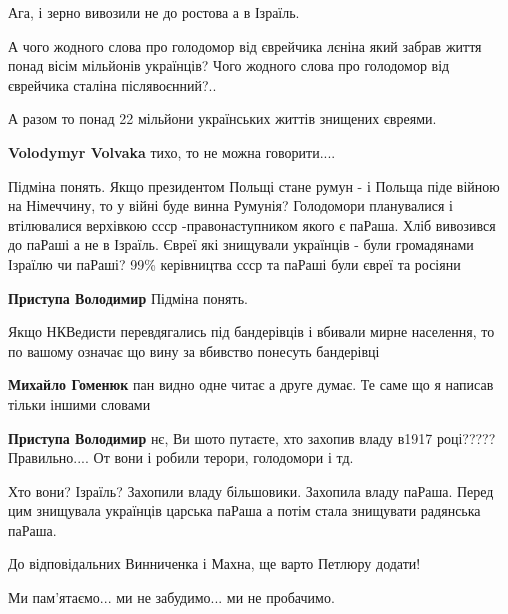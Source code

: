 \begin{itemize}
\begin{itemize} %
Ага, і зерно вивозили не до ростова а в Ізраїль.
\end{itemize} %


А чого жодного слова про голодомор від єврейчика лєніна який забрав життя понад
вісім мільйонів українців? Чого жодного слова про голодомор від єврейчика
сталіна післявоєнний?..

А разом то понад 22 мільйони українських життів знищених євреями.

\begin{itemize} %
\textbf{Volodymyr Volvaka} тихо, то не можна говорити....


Підміна понять. Якщо президентом Польщі стане румун - і Польща піде війною на
Німеччину, то у війні буде винна Румунія? Голодомори планувалися і втілювалися
верхівкою ссср -правонаступником якого є паРаша. Хліб вивозився до паРаші а не
в Ізраїль. Євреї які знищували українців - були громадянами Ізраїлю чи паРаші?
99\% керівництва ссср та паРаші були євреї та росіяни


\textbf{Приступа Володимир} Підміна понять.

Якщо НКВедисти перевдягались під бандерівців і вбивали мирне населення, то по
вашому означає що вину за вбивство понесуть бандерівці


\textbf{Михайло Гоменюк} пан видно одне читає а друге думає. Те саме що я написав тільки іншими словами

\textbf{Приступа Володимир} нє, Ви шото путаєте, хто захопив владу в1917 році?????
Правильно....
От вони і робили терори, голодомори і тд.


Хто вони? Ізраїль? Захопили владу більшовики. Захопила владу паРаша. Перед цим
знищувала українців царська паРаша а потім стала знищувати радянська паРаша.

\end{itemize} %

До відповідальних Винниченка і Махна, ще варто Петлюру додати!

Ми пам'ятаємо... ми не забудимо... ми не пробачимо.



\end{itemize}
